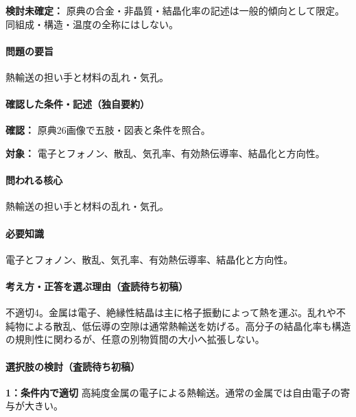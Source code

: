 \par\textbf{検討未確定：} 原典の合金・非晶質・結晶化率の記述は一般的傾向として限定。同組成・構造・温度の全称にはしない。

\paragraph{問題の要旨} 熱輸送の担い手と材料の乱れ・気孔。

\paragraph{確認した条件・記述（独自要約）}\mbox{}\par

\noindent\textbf{確認：} 原典26画像で五肢・図表と条件を照合。\par

\noindent\textbf{対象：} 電子とフォノン、散乱、気孔率、有効熱伝導率、結晶化と方向性。\par

\paragraph{問われる核心} 熱輸送の担い手と材料の乱れ・気孔。

\paragraph{必要知識} 電子とフォノン、散乱、気孔率、有効熱伝導率、結晶化と方向性。

\paragraph{考え方・正答を選ぶ理由（査読待ち初稿）} 不適切4。金属は電子、絶縁性結晶は主に格子振動によって熱を運ぶ。乱れや不純物による散乱、低伝導の空隙は通常熱輸送を妨げる。高分子の結晶化率も構造の規則性に関わるが、任意の別物質間の大小へ拡張しない。

\paragraph{選択肢の検討（査読待ち初稿）}\mbox{}\par

\noindent\textbf{1：条件内で適切} 高純度金属の電子による熱輸送。通常の金属では自由電子の寄与が大きい。\par

